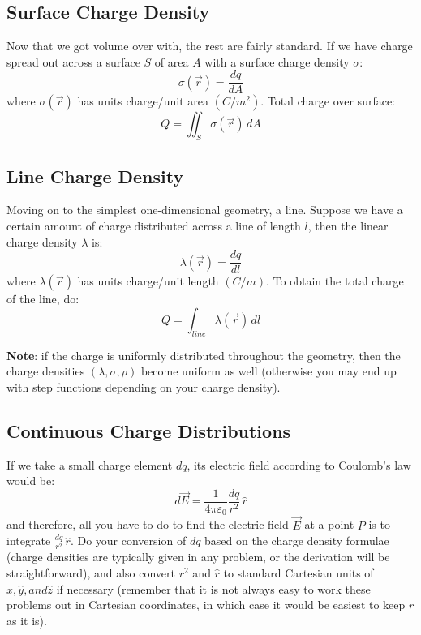 \documentclass[11pt, letterpaper]{article}
\begin{document}
	\subsection{Surface Charge Density}
	Now that we got volume over with, the rest are fairly standard. If we have charge spread out
	across a surface $S$ of area $A$ with a surface charge density $\sigma$:
	\begin{equation}\label{eqn:surface-charge-density}
		\boxed{\sigma(\vec{r}) = \frac{dq}{dA}}
	\end{equation}
	where $\sigma(\vec{r})$ has units charge/unit area $(C/m^2)$. Total charge over surface:
		\[Q = \displaystyle\iint_S\sigma(\vec{r}) \,dA\]
	
	\subsection{Line Charge Density}
	Moving on to the simplest one-dimensional geometry, a line. Suppose we have a certain amount
	of charge distributed across a line of length $l$, then the linear charge density $\lambda$ is:
	\begin{equation}\label{eqn:linear-charge-density}
		\boxed{\lambda(\vec{r}) = \frac{dq}{dl}}
	\end{equation}
	where $\lambda(\vec{r})$ has units charge/unit length $(C/m)$. To obtain the total charge of 
	the line, do:
		 \[Q = \displaystyle\int_{line}\lambda(\vec{r}) \,dl\]
	
	\noindent\textbf{Note}: if the charge is uniformly distributed throughout the geometry, then the 
	charge densities $(\lambda, \sigma, \rho)$ become uniform as well (otherwise you may end up 
	with step functions depending on your charge density).
	
	\subsection{Continuous Charge Distributions}
	If we take a small charge element $dq$, its electric field according to Coulomb's law would be:
		\[d\vec{E} = \frac{1}{4\pi\varepsilon_0}\frac{dq}{r^2}\,\hat{r}\]	
	and therefore, all you have to do to find the electric field $\vec{E}$ at a point $P$ is to integrate
	$\frac{dq}{r^2}\,\hat{r}$. Do your conversion of $dq$ based on the charge density formulae 
	(charge densities are typically given in any problem, or the derivation will be straightforward),
	and also convert $r^2$ and $\hat{r}$ to standard Cartesian units of $\hat{x}, \hat{y}, and\hat{z}$
	if necessary (remember that it is not always easy to work these problems out in Cartesian 
	coordinates, in which case it would be easiest to keep $r$ as it is).
	
\end{document}
